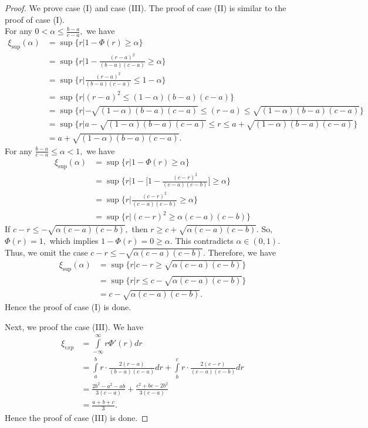 \documentclass[10pt,a4paper]{amsart}
\begin{document}
\begin{proof}
	We prove case (I) and case (III). The proof of case (II) is similar to the proof of case (I).\\
	For any $0<\alpha\leq \frac{b-a}{c-a},$ we have
	\begin{equation*} 
	\begin{aligned}
	\xi_{\sup}(\alpha)&=\sup\{r|1-\Phi(r)\geq \alpha\}\\
&=\sup\bigg\{r\bigg|1-\frac{(r-a)^2}{(b-a)(c-a)}\geq \alpha\bigg\}\\
&=\sup\bigg\{r\bigg|\frac{(r-a)^2}{(b-a)(c-a)}\leq 1-\alpha\bigg\}\\
&=\sup\{r|(r-a)^2\leq (1-\alpha)(b-a)(c-a)\}\\
&=\sup\bigg\{r|-\sqrt{(1-\alpha)(b-a)(c-a)}\leq (r-a)\leq \sqrt{(1-\alpha)(b-a)(c-a)}\bigg\}\\
&=\sup\bigg\{r|a-\sqrt{(1-\alpha)(b-a)(c-a)}\leq r\leq a+\sqrt{(1-\alpha)(b-a)(c-a)}\bigg\}\\
&=a+\sqrt{(1-\alpha)(b-a)(c-a)}.
\end{aligned}
\end{equation*}
For any $\frac{b-a}{c-a}\leq\alpha<1,$ we have
\begin{equation*} 
	\begin{aligned}
		\xi_{\sup}(\alpha)&=\sup\{r|1-\Phi(r)\geq \alpha\}\\
		&=\sup\bigg\{r\bigg|1-\bigg[1-\frac{(c-r)^2}{(c-a)(c-b)}\bigg]\geq \alpha\bigg\}\\
		&=\sup\bigg\{r\bigg|\frac{(c-r)^2}{(c-a)(c-b)}\geq \alpha\bigg\}\\
		&=\sup\{r|(c-r)^2\geq \alpha (c-a)(c-b)\}
	\end{aligned}
\end{equation*}
If $c-r\leq -\sqrt{\alpha(c-a)(c-b)},$ then $r\geq c+\sqrt{\alpha(c-a)(c-b)}.$ So, $\Phi(r)=1,$ which implies $1-\Phi(r)=0\geq \alpha.$ This contradicts $\alpha \in (0,1).$
Thus, we omit the case $c-r\leq -\sqrt{\alpha(c-a)(c-b)}.$  Therefore, we have 
\begin{equation*}
	\begin{aligned}
		\xi_{\sup}(\alpha)&=\sup\bigg\{r| c-r\geq \sqrt{\alpha(c-a)(c-b)}\bigg\}\\
		&=\sup\bigg\{r|r\leq c-\sqrt{\alpha(c-a)(c-b)}\bigg\}\\
		&=c-\sqrt{\alpha(c-a)(c-b)}.
	\end{aligned}
\end{equation*}
Hence the proof of case (I) is done.
\par Next, we proof the case (III). We have 
\begin{equation*} 
	\begin{aligned}
		\xi_{exp}&=\int\limits_{-\infty}^{\infty}r{\Phi}'(r)dr\\
		&=\int\limits_{a}^{b}r\cdot \frac{2(r-a)}{(b-a)(c-a)}dr+\int\limits_{b}^{c}r\cdot \frac{2(c-r)}{(c-a)(c-b)}dr\\
		&=\frac{2b^2-a^2-ab}{3(c-a)}+\frac{c^2+bc-2b^2}{3(c-a)}\\
		&=\frac{a+b+c}{3}.
	\end{aligned}
\end{equation*}
Hence the proof of case (III) is done.
\end{proof}
\end{document}
